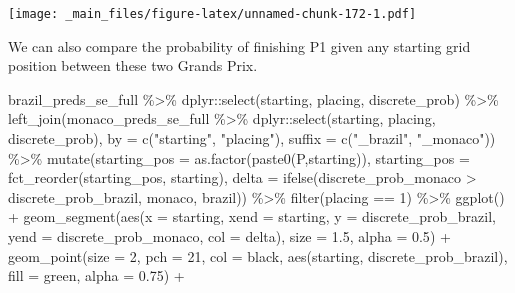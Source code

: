 \documentclass[
]{book}
\newenvironment{Shaded}{\begin{snugshade}}{\end{snugshade}}
\newcommand{\AttributeTok}[1]{\textcolor[rgb]{0.77,0.63,0.00}{#1}}
\newcommand{\DecValTok}[1]{\textcolor[rgb]{0.00,0.00,0.81}{#1}}
\newcommand{\FloatTok}[1]{\textcolor[rgb]{0.00,0.00,0.81}{#1}}
\newcommand{\FunctionTok}[1]{\textcolor[rgb]{0.00,0.00,0.00}{#1}}
\newcommand{\NormalTok}[1]{#1}
\newcommand{\SpecialCharTok}[1]{\textcolor[rgb]{0.00,0.00,0.00}{#1}}
\newcommand{\StringTok}[1]{\textcolor[rgb]{0.31,0.60,0.02}{#1}}
\begin{document}
\texttt{[image: \_main\_files/figure-latex/unnamed-chunk-172-1.pdf]}

We can also compare the probability of finishing P1 given any starting grid position between these two Grands Prix.

\begin{Shaded}
\begin{Highlighting}[]
\NormalTok{brazil\_preds\_se\_full }\SpecialCharTok{\%\textgreater{}\%}
\NormalTok{  dplyr}\SpecialCharTok{::}\FunctionTok{select}\NormalTok{(starting, placing, discrete\_prob) }\SpecialCharTok{\%\textgreater{}\%}
  \FunctionTok{left\_join}\NormalTok{(monaco\_preds\_se\_full }\SpecialCharTok{\%\textgreater{}\%}
\NormalTok{  dplyr}\SpecialCharTok{::}\FunctionTok{select}\NormalTok{(starting, placing, discrete\_prob), }\AttributeTok{by =} \FunctionTok{c}\NormalTok{(}\StringTok{"starting"}\NormalTok{, }\StringTok{"placing"}\NormalTok{), }\AttributeTok{suffix =} \FunctionTok{c}\NormalTok{(}\StringTok{"\_brazil"}\NormalTok{, }\StringTok{"\_monaco"}\NormalTok{)) }\SpecialCharTok{\%\textgreater{}\%}
  \FunctionTok{mutate}\NormalTok{(}\AttributeTok{starting\_pos =} \FunctionTok{as.factor}\NormalTok{(}\FunctionTok{paste0}\NormalTok{(}\StringTok{\textquotesingle{}P\textquotesingle{}}\NormalTok{,starting)),}
         \AttributeTok{starting\_pos =} \FunctionTok{fct\_reorder}\NormalTok{(starting\_pos, starting),}
         \AttributeTok{delta =} \FunctionTok{ifelse}\NormalTok{(discrete\_prob\_monaco }\SpecialCharTok{\textgreater{}}\NormalTok{ discrete\_prob\_brazil, }\StringTok{\textquotesingle{}monaco\textquotesingle{}}\NormalTok{, }\StringTok{\textquotesingle{}brazil\textquotesingle{}}\NormalTok{)) }\SpecialCharTok{\%\textgreater{}\%}
  \FunctionTok{filter}\NormalTok{(placing }\SpecialCharTok{==} \DecValTok{1}\NormalTok{) }\SpecialCharTok{\%\textgreater{}\%}
  \FunctionTok{ggplot}\NormalTok{() }\SpecialCharTok{+}
  \FunctionTok{geom\_segment}\NormalTok{(}\FunctionTok{aes}\NormalTok{(}\AttributeTok{x =}\NormalTok{ starting, }\AttributeTok{xend =}\NormalTok{ starting, }\AttributeTok{y =}\NormalTok{ discrete\_prob\_brazil, }\AttributeTok{yend =}\NormalTok{ discrete\_prob\_monaco, }\AttributeTok{col =}\NormalTok{ delta),}
               \AttributeTok{size =} \FloatTok{1.5}\NormalTok{, }\AttributeTok{alpha =} \FloatTok{0.5}\NormalTok{) }\SpecialCharTok{+}
  \FunctionTok{geom\_point}\NormalTok{(}\AttributeTok{size =} \DecValTok{2}\NormalTok{, }\AttributeTok{pch =} \DecValTok{21}\NormalTok{, }\AttributeTok{col =} \StringTok{\textquotesingle{}black\textquotesingle{}}\NormalTok{, }\FunctionTok{aes}\NormalTok{(starting, discrete\_prob\_brazil), }\AttributeTok{fill =} \StringTok{\textquotesingle{}green\textquotesingle{}}\NormalTok{, }\AttributeTok{alpha =} \FloatTok{0.75}\NormalTok{) }\SpecialCharTok{+}

\end{Highlighting}
\end{Shaded}
\end{document}
